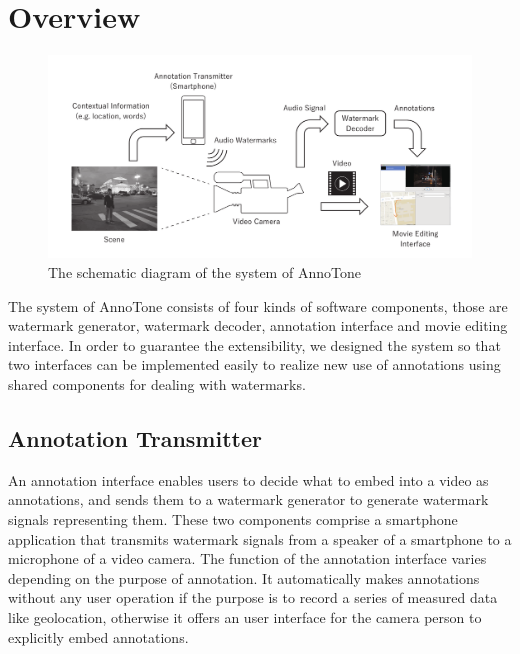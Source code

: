 \chapter{Overview}

\begin{figure}[htbp]
 \begin{center}
  \includegraphics[width=150mm]{overview.pdf}
 \end{center}
 \caption{The schematic diagram of the system of AnnoTone}
 \label{fig:one}
\end{figure}

The system of AnnoTone consists of four kinds of software components, those are watermark generator, watermark decoder, annotation interface and movie editing interface.
In order to guarantee the extensibility, we designed the system so that two interfaces can be implemented easily to realize new use of annotations using shared components for dealing with watermarks.

\section{Annotation Transmitter}
An annotation interface enables users to decide what to embed into a video as annotations, and sends them to a watermark generator to generate watermark signals representing them.
These two components comprise a smartphone application that transmits watermark signals from a speaker of a smartphone to a microphone of a video camera.
The function of the annotation interface varies depending on the purpose of annotation.
It automatically makes annotations without any user operation if the purpose is to record a series of measured data like geolocation, otherwise it offers an user interface for the camera person to explicitly embed annotations.

